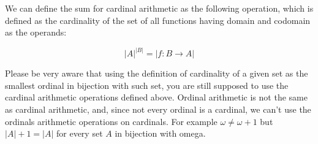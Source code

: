 \begin{definition}
We can define the sum for cardinal arithmetic as the following operation, which 
is defined as the cardinality of the set of all functions having domain and codomain 
as the operands:

$$ |A|^{|B|} = | { f : B \rightarrow A } | $$
\end{definition}
    
    
Please be very aware that using the definition of cardinality of a given set as the 
smallest ordinal in bijection with such set, you are still supposed to use the 
cardinal arithmetic operations defined above. Ordinal arithmetic is not the same as
cardinal arithmetic, and, since not every ordinal is a cardinal, we can't use the
ordinals arithmetic operations on cardinals. For example $\omega \neq \omega + 1$ but
$|A| + 1 = |A|$ for every set $A$ in bijection with omega. \\

\newpage